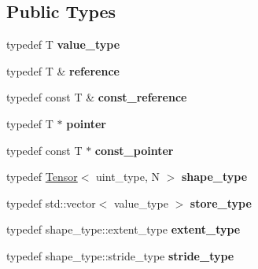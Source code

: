 \subsection*{Public Types}
\begin{DoxyCompactItemize}
\item 
\hypertarget{classbtas_1_1_sp_tensor_ad366948a0b25601ff0414454f34bb795}{
typedef T {\bfseries value\_\-type}}
\label{classbtas_1_1_sp_tensor_ad366948a0b25601ff0414454f34bb795}

\item 
\hypertarget{classbtas_1_1_sp_tensor_a30ea49818900e50f913e46ad65a19b3c}{
typedef T \& {\bfseries reference}}
\label{classbtas_1_1_sp_tensor_a30ea49818900e50f913e46ad65a19b3c}

\item 
\hypertarget{classbtas_1_1_sp_tensor_a8f77f9eaa75722362fca38a4c50d49c9}{
typedef const T \& {\bfseries const\_\-reference}}
\label{classbtas_1_1_sp_tensor_a8f77f9eaa75722362fca38a4c50d49c9}

\item 
\hypertarget{classbtas_1_1_sp_tensor_a71f40f5676236e05e624710b9c24232f}{
typedef T $\ast$ {\bfseries pointer}}
\label{classbtas_1_1_sp_tensor_a71f40f5676236e05e624710b9c24232f}

\item 
\hypertarget{classbtas_1_1_sp_tensor_ab213d7856a7090d2b8f8f11be97c4452}{
typedef const T $\ast$ {\bfseries const\_\-pointer}}
\label{classbtas_1_1_sp_tensor_ab213d7856a7090d2b8f8f11be97c4452}

\item 
\hypertarget{classbtas_1_1_sp_tensor_a33a340e329517653b004fb13ad30510f}{
typedef \hyperlink{classbtas_1_1_tensor}{Tensor}$<$ uint\_\-type, N $>$ {\bfseries shape\_\-type}}
\label{classbtas_1_1_sp_tensor_a33a340e329517653b004fb13ad30510f}

\item 
\hypertarget{classbtas_1_1_sp_tensor_a8a0ad2681578f0147e8179bc2b33d447}{
typedef std::vector$<$ value\_\-type $>$ {\bfseries store\_\-type}}
\label{classbtas_1_1_sp_tensor_a8a0ad2681578f0147e8179bc2b33d447}

\item 
\hypertarget{classbtas_1_1_sp_tensor_ae376b43518e1a268cfa15ea93a202fc0}{
typedef shape\_\-type::extent\_\-type {\bfseries extent\_\-type}}
\label{classbtas_1_1_sp_tensor_ae376b43518e1a268cfa15ea93a202fc0}

\item 
\hypertarget{classbtas_1_1_sp_tensor_afd08a4f83e519cba73099d8acd76ec70}{
typedef shape\_\-type::stride\_\-type {\bfseries stride\_\-type}}
\label{classbtas_1_1_sp_tensor_afd08a4f83e519cba73099d8acd76ec70}


\end{DoxyCompactItemize}
